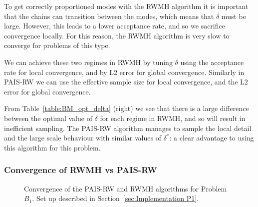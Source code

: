 \documentclass[final]{siamltex}
\begin{document}
To get correctly proportioned modes with the RWMH algorithm it is
important that the chains can transition between the modes, which
means that $\delta$ must be large. However, this leads to a lower
acceptance rate, and so we sacrifice convergence locally. For this reason, the RWMH algorithm is very slow to
converge for problems of this type.

We can achieve these two regimes in RWMH by tuning $\delta$ using the acceptance rate for local convergence, and by L2 error for global convergence. Similarly in PAIS-RW we can use the effective sample size for local convergence, and the L2 error for global convergence.

From Table~\ref{table:BM_opt_delta} (right) we see that there is a large difference between the optimal value of $\delta$ for each regime in RWMH, and so will result in inefficient sampling. The PAIS-RW algorithm manages to sample the local detail and the large scale behaviour with similar values of $\delta^*$: a clear advantage to using this algorithm for this problem.

\subsubsection{Convergence of RWMH vs PAIS-RW}


\begin{figure}[htb]
\centering
{}
\caption{Convergence of the PAIS-RW and RWMH algorithms for Problem $B_1$. Set up described in Section~\ref{sec:Implementation P1}.}
\label{fig:BM1_L2}
\end{figure}
\end{document}
